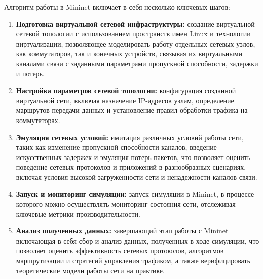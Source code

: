 Алгоритм работы в Mininet включает в себя несколько ключевых шагов:
\begin{enumerate}
\item \textbf{Подготовка виртуальной сетевой инфраструктуры:} создание виртуальной сетевой топологии с использованием пространств имен Linux и технологии виртуализации, позволяющее моделировать работу отдельных сетевых узлов, как коммутаторов, так и конечных устройств, связывая их виртуальными каналами связи с заданными параметрами пропускной способности, задержки и потерь.
\item \textbf{Настройка параметров сетевой топологии:} конфигурация созданной виртуальной сети, включая назначение IP-адресов узлам, определение маршрутов передачи данных и установление правил обработки трафика на коммутаторах.
\item \textbf{Эмуляция сетевых условий:} имитация различных условий работы сети, таких как изменение пропускной способности каналов, введение искусственных задержек и эмуляция потерь пакетов, что позволяет оценить поведение сетевых протоколов и приложений в разнообразных сценариях, включая условия высокой загруженности сети и ненадежности каналов связи.
\item \textbf{Запуск и мониторинг симуляции:} запуск симуляции в Mininet, в процессе которого можно осуществлять мониторинг состояния сети, отслеживая ключевые метрики производительности.
\item \textbf{Анализ полученных данных:} завершающий этап работы с Mininet включающая в себя сбор и анализ данных, полученных в ходе симуляции, что позволяет оценить эффективность сетевых протоколов, алгоритмов маршрутизации и стратегий управления трафиком, а также верифицировать теоретические модели работы сети на практике.
\end{enumerate}



